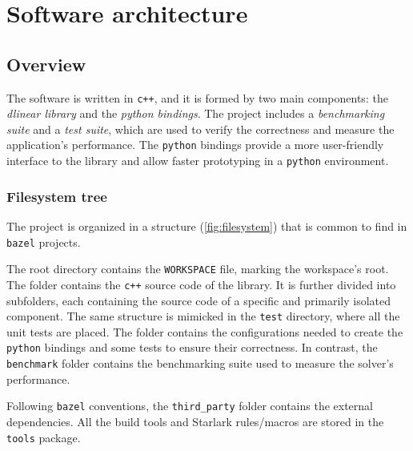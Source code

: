 \chapter{Software architecture}

\section{Overview}

The software is written in \texttt{c++}, and it is formed by two main components: the \textit{dlinear library} and the \textit{python bindings}.
The project includes a \textit{benchmarking suite} and a \textit{test suite}, which are used to verify the correctness and measure the application's performance.
The \texttt{python} bindings provide a more user-friendly interface to the library and allow faster prototyping in a \texttt{python} environment.

\subsection*{Filesystem tree}

The project is organized in a structure (\autoref{fig:filesystem}) that is common to find in \texttt{bazel} projects.

The root directory contains the \texttt{WORKSPACE} file, marking the workspace's root.
The \dlinear folder contains the \texttt{c++} source code of the library.
It is further divided into subfolders, each containing the source code of a specific and primarily isolated component.
The same structure is mimicked in the \texttt{test} directory, where all the unit tests are placed.
The \pydlinear folder contains the configurations needed to create the \texttt{python} bindings and some tests to ensure their correctness. In contrast, the \texttt{benchmark} folder contains the benchmarking suite used to measure the solver's performance.

Following \texttt{bazel} conventions, the \texttt{third\_party} folder contains the external dependencies.
All the build tools and Starlark rules/macros are stored in the \texttt{tools} package.


